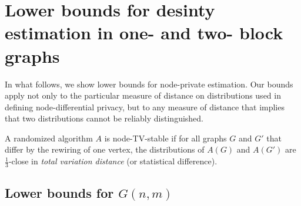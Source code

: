 
\section{Lower bounds for desinty estimation in one- and two- block graphs}
\label{sec:lower}

In what follows, we show lower bounds for node-private estimation. Our bounds apply not only to the particular measure of distance on distributions used in defining node-differential privacy, but to any measure of distance that implies that two distributions cannot be reliably distinguished. 

\begin{definition}
  A randomized algorithm $A$ is node-TV-stable if for all graphs $G$
  and $G'$ that differ by the rewiring of one vertex, the
  distributions of $A(G)$ and $A(G')$ are $\tfrac 1 3$-close in
  \emph{total variation distance} (or statistical difference).
\end{definition}

\subsection{Lower bounds for $G(n,m)$}










